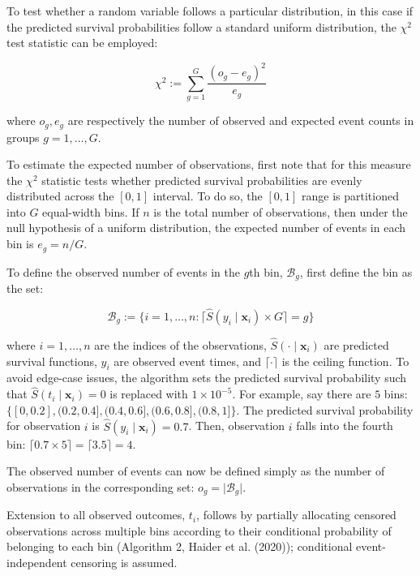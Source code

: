 \documentclass[
  letterpaper,
  krantz2]{style/krantz}
\begin{document}
To test whether a random variable follows a particular distribution, in
this case if the predicted survival probabilities follow a standard
uniform distribution, the \(\chi^2\) test
statistic can be employed:

\[
\chi^2 := \sum_{g=1}^G \frac{(o_g - e_g)^2}{e_g}
\]

where \(o_g, e_g\) are respectively the number of observed and expected
event counts in groups \(g = 1,\ldots,G\).

To estimate the expected number of observations, first note that for
this measure the \(\chi^2\) statistic tests whether predicted survival
probabilities are evenly distributed across the \([0,1]\) interval. To
do so, the \([0,1]\) range is partitioned into \(G\) equal-width bins.
If \(n\) is the total number of observations, then under the null
hypothesis of a uniform distribution, the expected number of events in
each bin is \(e_g = n/G\).

To define the observed number of events in the \(g\)th bin,
\(\mathcal{B}_g\), first define the bin as the set:

\[
\mathcal{B}_g := \{i = 1,\ldots,n : \lceil \hat{S}(y_i \mid \mathbf{x}_i) \times G \rceil = g\}
\]

where \(i = 1,\ldots,n\) are the indices of the observations,
\(\hat{S}(\cdot \mid \mathbf{x}_i)\) are predicted survival functions,
\(y_i\) are observed event times, and \(\lceil \cdot \rceil\) is the
ceiling function. To avoid edge-case issues, the algorithm sets the
predicted survival probability such that
\(\hat{S}(t_i \mid \mathbf{x}_i) = 0\) is replaced with
\(1\times10^{-5}\). For example, say there are \(5\) bins:
\(\{[0, 0.2], (0.2, 0.4], (0.4, 0.6], (0.6, 0.8], (0.8, 1]\}\). The
predicted survival probability for observation \(i\) is
\(\hat{S}(y_i \mid \mathbf{x}_i) = 0.7\). Then, observation \(i\) falls
into the fourth bin:
\(\lceil 0.7 \times 5 \rceil = \lceil 3.5 \rceil = 4\).

The observed number of events can now be defined simply as the number of
observations in the corresponding set:
\(o_g = \vert \mathcal{B}_g \vert\).

Extension to all observed outcomes, \(t_i\), follows by partially
allocating censored observations across multiple bins according to their
conditional probability of belonging to each bin (Algorithm 2, Haider et
al. (2020)); conditional event-independent censoring is assumed.
\end{document}
